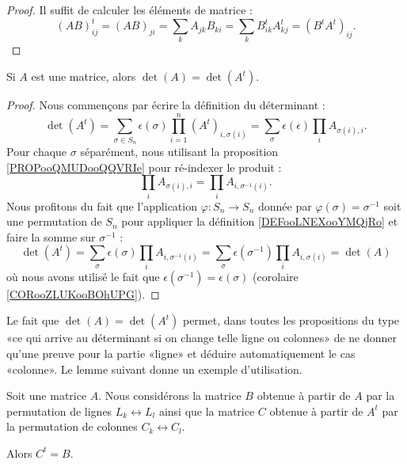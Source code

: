 \begin{proof}
    Il suffit de calculer les éléments de matrice :
    \begin{equation}
        (AB)^t_{ij}=(AB)_{ji}=\sum_k A_{jk}B_{ki}=\sum_kB^t_{ik}A^t_{kj}=(B^tA^t)_{ij}.
    \end{equation}
\end{proof}

\begin{lemma}        \label{LEMooCEQYooYAbctZ}
    Si \( A\) est une matrice, alors \( \det(A)=\det(A^t)\).
\end{lemma}

\begin{proof}
    Nous commençons par écrire la définition du déterminant :
    \begin{equation}
        \det(A^t)=\sum_{\sigma\in S_n}\epsilon(\sigma)\prod_{i=1}^n(A^t)_{i,\sigma(i)}=\sum_{\sigma}\epsilon(\epsilon)\prod_iA_{\sigma(i),i}.
    \end{equation}
    Pour chaque \( \sigma\) séparément, nous utilisant la proposition \ref{PROPooQMUDooQQVRIe} pour ré-indexer le produit :
    \begin{equation}
        \prod_i A_{\sigma(i),i}=\prod_iA_{i,\sigma^{-1}(i)}.
    \end{equation}
    Nous profitons du fait que l'application \( \varphi\colon S_n\to S_n\) donnée par \( \varphi(\sigma)=\sigma^{-1}\) soit une permutation de \( S_n\) pour appliquer la définition \ref{DEFooLNEXooYMQjRo} et faire la somme sur \( \sigma^{-1}\) :
    \begin{equation}
        \det(A^t)=\sum_{\sigma}\epsilon(\sigma)\prod_iA_{i,\sigma^{-1}(i)}=\sum_{\sigma}\epsilon(\sigma^{-1})\prod_iA_{i,\sigma(i)}=\det(A)
    \end{equation}
    où nous avons utilisé le fait que \(\epsilon(\sigma^{-1})=\epsilon(\sigma)\) (corolaire \ref{CORooZLUKooBOhUPG}).
\end{proof}

Le fait que \( \det(A)=\det(A^t)\) permet, dans toutes les propositions du type «ce qui arrive au déterminant si on change telle ligne ou colonnes» de ne donner qu'une preuve pour la partie «ligne» et déduire automatiquement le cas «colonne». Le lemme suivant donne un exemple d'utilisation.

\begin{lemma}        \label{LEMooWMQWooGWFlmC}
    Soit une matrice \( A\). Nous considérons la matrice \( B\) obtenue à partir de \( A\) par la permutation de lignes \( L_k\leftrightarrow L_l\) ainsi que la matrice \( C\) obtenue à partir de \( A^t\) par la permutation de colonnes \( C_k\leftrightarrow C_l\).
    
    Alors \( C^t=B\).
\end{lemma}

